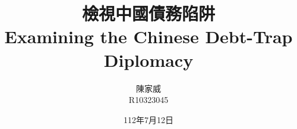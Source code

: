 \documentclass[mathserif]{beamer}
\title{檢視中國債務陷阱\\Examining the Chinese Debt-Trap Diplomacy}
\author{陳家威\\{\small R10323045}}
\date{112年7月12日}
\begin{document}
    \begin{frame}
        \maketitle
    \end{frame}

\end{document}
